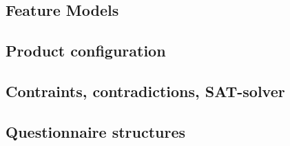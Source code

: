 \subsection{Feature Models}

\subsection{Product configuration}

\subsection{Contraints, contradictions, SAT-solver}

\subsection{Questionnaire structures}
